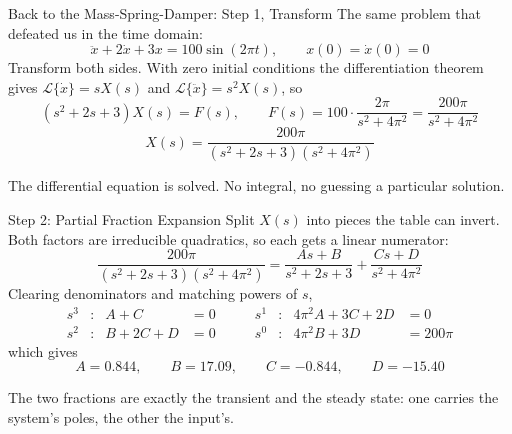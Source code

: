 \documentclass[12pt, aspectratio=169]{beamer}
\begin{document}

\begin{frame}{Back to the Mass-Spring-Damper: Step 1, Transform}
    The same problem that defeated us in the time domain:
    \[
        \ddot{x} + 2\dot{x} + 3x = 100\sin(2\pi t), \qquad x(0) = \dot{x}(0) = 0
    \]
    Transform both sides. With zero initial conditions the differentiation theorem gives
    $\mathcal{L}\{\dot{x}\} = sX(s)$ and $\mathcal{L}\{\ddot{x}\} = s^2X(s)$, so
    \[
        \left(s^2 + 2s + 3\right)X(s) = F(s),
        \qquad
        F(s) = 100 \cdot \frac{2\pi}{s^2 + 4\pi^2} = \frac{200\pi}{s^2 + 4\pi^2}
    \]
    \vspace{-0.6em}
    \[
        \boxed{\;X(s) = \frac{200\pi}{\left(s^2+2s+3\right)\left(s^2+4\pi^2\right)}\;}
    \]
    \begin{center}
        The differential equation is solved. No integral, no guessing a particular solution.
    \end{center}
\end{frame}


\begin{frame}{Step 2: Partial Fraction Expansion}
    Split $X(s)$ into pieces the table can invert. Both factors are irreducible quadratics,
    so each gets a linear numerator:
    \[
        \frac{200\pi}{\left(s^2+2s+3\right)\left(s^2+4\pi^2\right)}
        = \frac{As+B}{s^2+2s+3} + \frac{Cs+D}{s^2+4\pi^2}
    \]
    Clearing denominators and matching powers of $s$,
    \[
        \begin{aligned}
            s^3&: & A + C &= 0 &\qquad
            s^1&: & 4\pi^2 A + 3C + 2D &= 0 \\
            s^2&: & B + 2C + D &= 0 &\qquad
            s^0&: & 4\pi^2 B + 3D &= 200\pi
        \end{aligned}
    \]
    which gives
    \[
        A = 0.844, \qquad B = 17.09, \qquad C = -0.844, \qquad D = -15.40
    \]
    \begin{center}
        \small The two fractions are exactly the \alert{transient} and the
        \alert{steady state}: one carries the system's poles, the other the input's.
    \end{center}
\end{frame}

\end{document}
